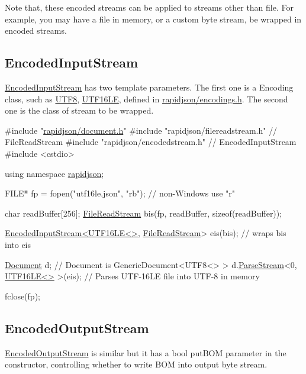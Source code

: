 Note that, these encoded streams can be applied to streams other than file. For example, you may have a file in memory, or a custom byte stream, be wrapped in encoded streams.\hypertarget{md_Commun_Externe_RapidJSON_doc_stream.zh-cn_EncodedInputStream}{}\subsection{Encoded\+Input\+Stream}\label{md_Commun_Externe_RapidJSON_doc_stream.zh-cn_EncodedInputStream}
{\ttfamily \hyperlink{class_encoded_input_stream}{Encoded\+Input\+Stream}} has two template parameters. The first one is a {\ttfamily Encoding} class, such as {\ttfamily \hyperlink{struct_u_t_f8}{U\+T\+F8}}, {\ttfamily \hyperlink{struct_u_t_f16_l_e}{U\+T\+F16\+LE}}, defined in {\ttfamily \hyperlink{encodings_8h_source}{rapidjson/encodings.\+h}}. The second one is the class of stream to be wrapped.


\begin{DoxyCode}
\textcolor{preprocessor}{#include "\hyperlink{document_8h}{rapidjson/document.h}"}
\textcolor{preprocessor}{#include "rapidjson/filereadstream.h"}   \textcolor{comment}{// FileReadStream}
\textcolor{preprocessor}{#include "rapidjson/encodedstream.h"}    \textcolor{comment}{// EncodedInputStream}
\textcolor{preprocessor}{#include <cstdio>}

\textcolor{keyword}{using namespace }\hyperlink{namespacerapidjson}{rapidjson};

FILE* fp = fopen(\textcolor{stringliteral}{"utf16le.json"}, \textcolor{stringliteral}{"rb"}); \textcolor{comment}{// non-Windows use "r"}

\textcolor{keywordtype}{char} readBuffer[256];
\hyperlink{class_file_read_stream}{FileReadStream} bis(fp, readBuffer, \textcolor{keyword}{sizeof}(readBuffer));

\hyperlink{class_encoded_input_stream}{EncodedInputStream<UTF16LE<>}, \hyperlink{class_file_read_stream}{FileReadStream}> eis(bis);  \textcolor{comment}{// wraps
       bis into eis}

\hyperlink{class_generic_document}{Document} d; \textcolor{comment}{// Document is GenericDocument<UTF8<> > }
d.\hyperlink{class_generic_document_afe94c0abc83a20f2d7dc1ba7677e6238}{ParseStream}<0, \hyperlink{struct_u_t_f16_l_e}{UTF16LE<>} >(eis);  \textcolor{comment}{// Parses UTF-16LE file into UTF-8 in memory}

fclose(fp);
\end{DoxyCode}
\hypertarget{md_Commun_Externe_RapidJSON_doc_stream.zh-cn_EncodedOutputStream}{}\subsection{Encoded\+Output\+Stream}\label{md_Commun_Externe_RapidJSON_doc_stream.zh-cn_EncodedOutputStream}
{\ttfamily \hyperlink{class_encoded_output_stream}{Encoded\+Output\+Stream}} is similar but it has a {\ttfamily bool put\+B\+OM} parameter in the constructor, controlling whether to write B\+OM into output byte stream.


